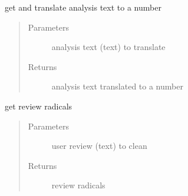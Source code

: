 \documentclass[letterpaper,10pt,english]{sphinxmanual}
\begin{document}
\sphinxAtStartPar
{}

\label{\detokenize{algorithms:module-algorithms.isg.isg_utils}}

\begin{fulllineitems}
\label{\detokenize{algorithms:algorithms.isg.isg_utils.isg_analysis_translator}}
\sphinxAtStartPar
get and translate analysis text to a number
\begin{quote}\begin{description}
\item[{Parameters}] \leavevmode
\sphinxAtStartPar
{} \textendash{} analysis text (text) to translate

\item[{Returns}] \leavevmode
\sphinxAtStartPar
analysis text translated to a number

\end{description}\end{quote}

\end{fulllineitems}


\begin{fulllineitems}
\label{\detokenize{algorithms:algorithms.isg.isg_utils.transform_text}}
\sphinxAtStartPar
get review radicals
\begin{quote}\begin{description}
\item[{Parameters}] \leavevmode
\sphinxAtStartPar
{} \textendash{} user review (text) to clean

\item[{Returns}] \leavevmode
\sphinxAtStartPar
review radicals

\end{description}\end{quote}

\end{fulllineitems}
\end{document}
